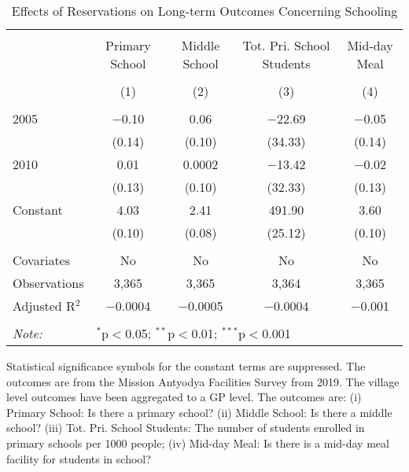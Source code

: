 \begin{table}[!htbp]
\centering
\begin{threeparttable}

  \caption{Effects of Reservations on Long-term Outcomes Concerning Schooling} 
  \label{raj_shrug_schooling_05_10} 
\scriptsize 
\begin{tabular}{@{\extracolsep{0pt}}lcccc} 
\\[-1.8ex]\hline 
\hline \\[-1.8ex] 
 & Primary School & Middle School & Tot. Pri. School Students & Mid-day Meal \\ 
\\[-1.8ex] & (1) & (2) & (3) & (4)\\ 
\hline \\[-1.8ex] 
 2005 & $-$0.10 & 0.06 & $-$22.69 & $-$0.05 \\ 
  & (0.14) & (0.10) & (34.33) & (0.14) \\ 
  2010 & 0.01 & 0.0002 & $-$13.42 & $-$0.02 \\ 
  & (0.13) & (0.10) & (32.33) & (0.13) \\ 
  Constant & 4.03 & 2.41 & 491.90 & 3.60 \\ 
  & (0.10) & (0.08) & (25.12) & (0.10) \\ 
 \hline \\[-1.8ex] 
Covariates & No & No & No & No \\ 
Observations & 3,365 & 3,365 & 3,364 & 3,365 \\ 
Adjusted R$^{2}$ & $-$0.0004 & $-$0.0005 & $-$0.0004 & $-$0.001 \\ 
\hline 
\hline \\[-1.8ex] 
\textit{Note:}  & \multicolumn{4}{l}{$^{*}$p$<$0.05; $^{**}$p$<$0.01; $^{***}$p$<$0.001} \\ 
\end{tabular} 
\begin{tablenotes}[flushleft]
\scriptsize
\item Statistical significance symbols for the constant terms are suppressed. The outcomes are from the Mission Antyodya Facilities Survey from 2019. 
                     The village level outcomes have been aggregated to a GP level. 
                     The outcomes are:
                         (i) Primary School: Is there a primary school?
                         (ii) Middle School: Is there a middle school?
                         (iii) Tot. Pri. School Students: The number of students enrolled in primary schools per 1000 people;
                         (iv) Mid-day Meal: Is there is a mid-day meal facility for students in school?
\end{tablenotes}
\end{threeparttable}
\end{table}
